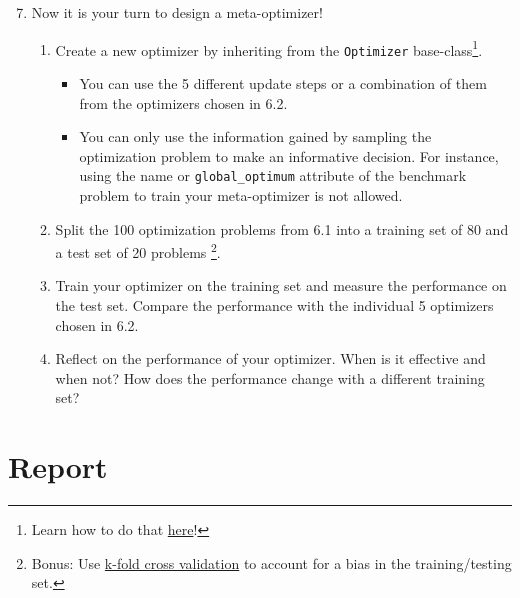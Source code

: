 \documentclass[10pt,a4paper,twoside]{article} %
\def\code#1{\texttt{#1}}
\begin{document}
\begin{enumerate}
    \setcounter{enumi}{6}
    \item Now it is your turn to design a meta-optimizer! 
    

    
    \begin{enumerate} [label*=\arabic*.]
        \item Create a new optimizer by inheriting from the \code{Optimizer} base-class\footnote{Learn how to do that \href{https://bessagroup.github.io/F3DASM/capabilities/algorithms.html\#implement-your-own-optimizer}{here}!}. 
        
        \begin{itemize}
            \item You can use the 5 different update steps or a combination of them from the optimizers chosen in 6.2.
            \item You can only use the information gained by sampling the optimization problem to make an informative decision. For instance, using the name or \code{global\_optimum} attribute of the benchmark problem to train your meta-optimizer is not allowed.
        \end{itemize}
        
        \item Split the 100 optimization problems from 6.1 into a training set of 80 and a test set of 20 problems \footnote{Bonus: Use \href{https://machinelearningmastery.com/k-fold-cross-validation/}{k-fold cross validation} to account for a bias in the training/testing set.}.
        
        \item Train your optimizer on the training set and measure the performance on the test set. Compare the performance with the individual 5 optimizers chosen in 6.2.
        
        \item Reflect on the performance of your optimizer. When is it effective and when not? How does the performance change with a different training set?
        
    \end{enumerate}
    
\end{enumerate}

\section*{Report}
\end{document}
